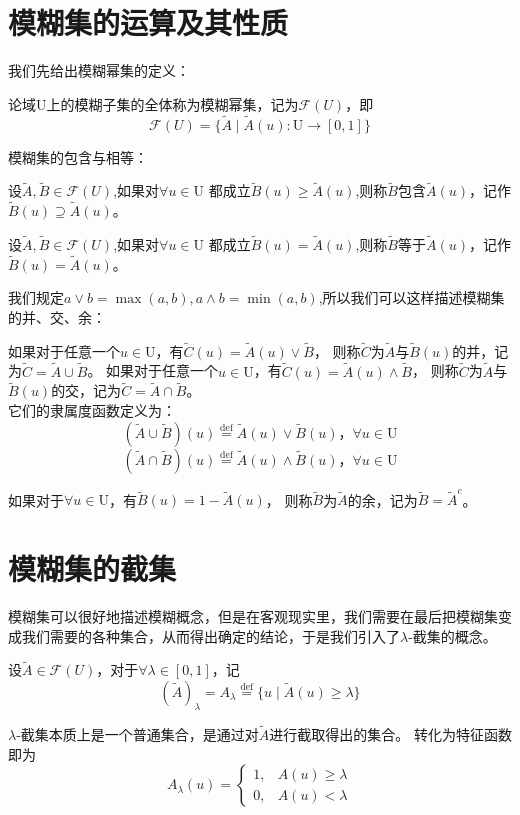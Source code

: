 \section{模糊集的运算及其性质}
我们先给出模糊幂集的定义：
\begin{definition}
    论域$\mathrm{U}$上的模糊子集的全体称为模糊幂集，记为$\mathscr{F}(U)$，即
    \[
        \mathscr{F}(U)=\{\tilde{A} \mid \tilde{A}(u):\mathrm{U} \to [0,1]\}
    \]
\end{definition}
模糊集的包含与相等：
\begin{definition}
    设$\tilde{A}, \tilde{B} \in \mathscr{F}(U)$,如果对$\forall u \in \mathrm{U}$
    都成立$\tilde{B}(u)\geqslant \tilde{A}(u)$,则称$\tilde{B}$包含$\tilde{A}(u)$，记作$\tilde{B}(u )\supseteq \tilde{A}(u)$。
\end{definition}
\begin{definition}
    设$\tilde{A}, \tilde{B} \in \mathscr{F}(U)$,如果对$\forall u \in \mathrm{U}$
    都成立$\tilde{B}(u) = \tilde{A}(u)$,则称$\tilde{B}$等于$\tilde{A}(u)$，记作$\tilde{B}(u)= \tilde{A}(u)$。
\end{definition}
我们规定$a\vee b=\max(a,b),a\wedge b=\min(a,b)$,所以我们可以这样描述模糊集的并、交、余：

\begin{definition}
    如果对于任意一个$u \in \mathrm{U}$，有$\tilde{C}(u)=\tilde{A}(u) \vee \tilde{B}$，
    则称$\tilde{C}$为$\tilde{A}$与$\tilde{B}(u)$的并，记为$\tilde{C}=\tilde{A} \cup \tilde{B}$。
    如果对于任意一个$u \in \mathrm{U}$，有$\tilde{C}(u)=\tilde{A}(u) \wedge \tilde{B}$，
    则称$\tilde{C}$为$\tilde{A}$与$\tilde{B}(u)$的交，记为$\tilde{C}=\tilde{A} \cap \tilde{B}$。\\
    它们的隶属度函数定义为：
    \[
        (\tilde{A}\cup  \tilde{B})(u) \stackrel{\mathrm{def} }{=}\tilde{A}(u) \vee \tilde{B}(u) ， \forall u \in \mathrm{U}
    \]
    \[
        (\tilde{A}\cap  \tilde{B})(u) \stackrel{\mathrm{def} }{=}\tilde{A}(u) \wedge \tilde{B}(u) ，\forall u \in \mathrm{U}
    \]
\end{definition}
\begin{definition}
    如果对于$\forall u \in \mathrm{U}$，有$\tilde{B}(u)=1-\tilde{A}(u) $，
    则称$\tilde{B}$为$\tilde{A}$的余，记为$\tilde{B}=\tilde{A}^c$。
\end{definition}
\section{模糊集的截集}
模糊集可以很好地描述模糊概念，但是在客观现实里，我们需要在最后把模糊集变成我们需要的各种集合，从而得出确定的结论，于是我们引入了$\lambda$-截集的概念。
\begin{definition}
    设$\tilde{A}\in \mathscr{F}(U)$，对于$\forall \lambda \in [0,1]$，记
    \[
        (\tilde{A})_{\lambda}=A_{\lambda} \stackrel{\mathrm{def}}{=}\{u \mid \tilde{A}(u) \geqslant \lambda\}
    \]
\end{definition}
$\lambda$-截集本质上是一个普通集合，是通过对$\tilde{A}$进行截取得出的集合。
转化为特征函数即为
\[
    A_{\lambda}(u)=\left\{\begin{array}{ll}
        1, & A(u) \geqslant \lambda \\
        0, & A(u)<\lambda
    \end{array}\right.
\]